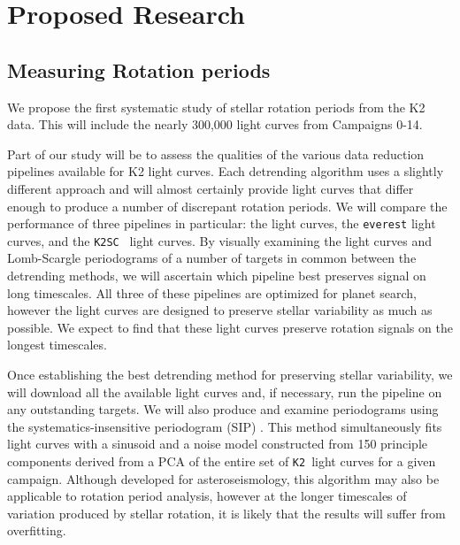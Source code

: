 \documentclass[12pt]{article}
\newcommand{\racomment}[1]{{\color{red}#1}}
\newcommand{\ktwosc}{{\tt K2SC}}
\newcommand{\ktwo}{{\tt K2}}
\begin{document}
 
 
 


\section{Proposed Research}
\subsection{Measuring Rotation periods}
We propose the first systematic study of stellar rotation periods from the K2
data. This will include the nearly 300,000 light curves from Campaigns 0-14.

Part of our study will be to assess the qualities of the various data
reduction pipelines available for K2 light curves.
Each detrending algorithm uses a slightly different approach and will almost
certainly provide light curves that differ enough to produce a number of
discrepant rotation periods.
We will compare the performance of three pipelines in particular: the
\citet{Vanderburg2015} light curves, the {\tt everest} \citet{luger2016} light
curves, and the \ktwosc\ \citet{aigrain2016} light curves.
By visually examining the light curves and Lomb-Scargle periodograms of a
number of targets in common between the detrending methods, we will ascertain
which pipeline best preserves signal on long timescales.
All three of these pipelines are optimized for planet search, however the
\citet{aigrain2016} light curves are designed to preserve stellar variability
as much as possible.
We expect to find that these light curves preserve rotation signals on the
longest timescales.


Once establishing the best detrending method for preserving stellar
variability, we will download all the available light curves and, if
necessary, run the pipeline on any outstanding targets.
We will also produce and examine periodograms using the
systematics-insensitive periodogram (SIP) \citep{angus2015}.
This method simultaneously fits light curves with a sinusoid and a noise
model constructed from 150 principle components derived from a PCA of the
entire set of \ktwo\ light curves for a given campaign.
Although developed for asteroseismology, this algorithm may also be applicable
to rotation period analysis, however at the longer timescales of variation
produced by stellar rotation, it is likely that the results will suffer
from overfitting.
\end{document}

